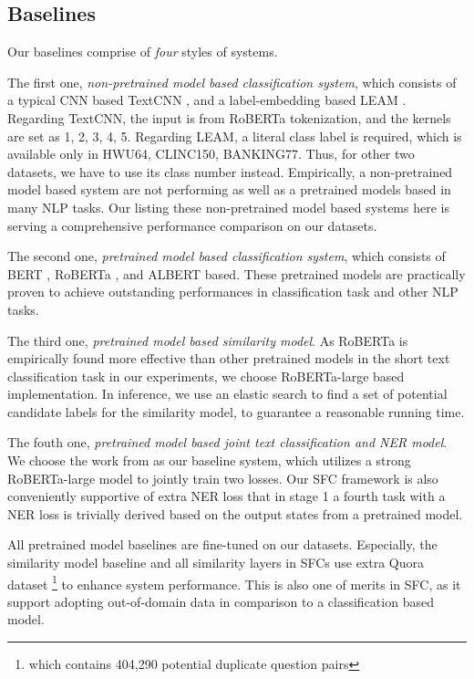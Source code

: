 \subsection{Baselines}
Our baselines comprise of \emph{four} styles of systems. 

The first one, \emph{non-pretrained model based classification system}, which consists of a typical CNN based TextCNN \cite{kim2014convolutional}, and a label-embedding based LEAM \cite{wang2018joint}. 
Regarding TextCNN, the input is from RoBERTa tokenization, and the kernels are set as 1, 2, 3, 4, 5. 
Regarding LEAM, a literal class label is required, which is available only in HWU64, CLINC150, BANKING77. 
Thus, for other two datasets, we have to use its class number instead. 
Empirically, a non-pretrained model based system are not performing as well as a pretrained models based in many NLP tasks.
Our listing these non-pretrained model based systems here is serving a comprehensive performance comparison on our datasets.

The second one, \emph{pretrained model based classification system}, which consists of BERT \cite{devlin2018bert}, RoBERTa \cite{liu2019roberta}, and ALBERT \cite{lan2019albert} based. 
These pretrained models are practically proven to achieve outstanding performances in classification task and other NLP tasks.

The third one, \emph{pretrained model based similarity model}. 
As RoBERTa is empirically found more effective than other pretrained models in the short text classification task in our experiments, we choose RoBERTa-large based implementation.
In inference, we use an elastic search to find a set of potential candidate labels for the similarity model, to guarantee a reasonable running time.

The fouth one, \emph{pretrained model based joint text classification and NER model}. 
We choose the work from \cite{chen2019bert} as our baseline system, which utilizes a strong RoBERTa-large model to jointly train two losses.
Our SFC framework is also conveniently supportive of extra NER loss that in stage 1 a fourth task with a NER loss is trivially derived based on the output states from a pretrained model.

All pretrained model baselines are fine-tuned on our datasets.
Especially, the similarity model baseline and all similarity layers in SFCs use extra Quora dataset \cite{iyer2017first} \footnote{which contains 404,290 potential duplicate question pairs} to enhance system performance. 
This is also one of merits in SFC, as it support adopting out-of-domain data in comparison to a classification based model.

